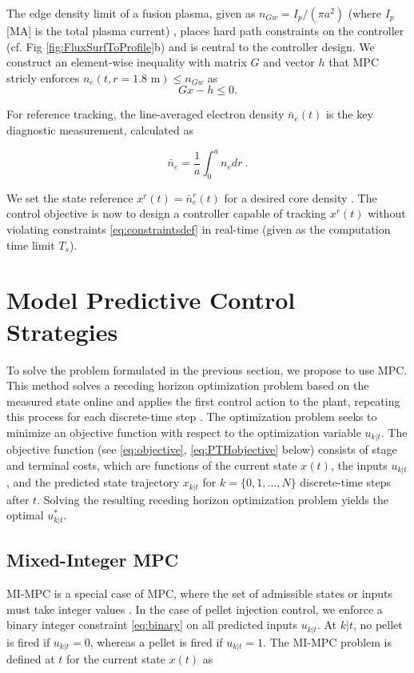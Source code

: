 \documentclass[journal,twoside,web]{ieeecolor}
\begin{document}
The edge density limit of a fusion plasma, given as $n_{Gw} = I_p/(\pi a^2)$ (where $I_p$ [MA] is the total plasma current) \cite{Greenwald1988}, places hard path constraints on the controller (cf. Fig \ref{fig:FluxSurfToProfile}b) and is central to the controller design. We construct an element-wise inequality with matrix $G$ and vector $h$ that MPC stricly enforces $n_e(t,r=1.8\textrm{ m}) \leq n_{Gw}$ as 
\begin{equation}
Gx - h \leq 0. \label{eq:constraintsdef}
\end{equation}

For reference tracking, the line-averaged electron density $\bar{n}_e(t)$ \cite{Heald1965} is the key diagnostic measurement, calculated as 

\begin{equation}
 \bar{n}_e = \frac{1}{a}\int_0^an_edr \!~ . \label{eq:lineAvgDens}
\end{equation}

\noindent We set the state reference $x^r(t) = \bar{n}_e^r(t)$ for a desired core density \cite{Bosman2021kalman}. The control objective is now to design a controller capable of tracking $x^r(t)$ without violating constraints \eqref{eq:constraintsdef} in real-time (given as the computation time limit $T_s$). 

\section{Model Predictive Control Strategies}
\label{sec:MPCapproach}
To solve the problem formulated in the previous section, we propose to use MPC. This method solves a receding horizon optimization problem based on the measured state online and applies the first control action to the plant, repeating this process for each discrete-time step \cite{Rawlings2017}. The optimization problem seeks to minimize an objective function with respect to the optimization variable $u_{k|t}$. The objective function (see \eqref{eq:objective}, \eqref{eq:PTHobjective} below) consists of stage and terminal costs, which are functions of the current state $x(t)$, the inputs $u_{k|t}$, and the predicted state trajectory $x_{k|t}$ for $k = \{0, 1,\ldots,N\}$ discrete-time steps after $t$. Solving the resulting receding horizon optimization problem yields the optimal $u^*_{k|t}$. 

\subsection{Mixed-Integer MPC}
\label{subsec:MIQP}
MI-MPC is a special case of MPC, where the set of admissible states or inputs must take integer values \cite{Kirches2011}. In the case of pellet injection control, we enforce a binary integer constraint \eqref{eq:binary} on all predicted inputs $u_{k|t}$. At $k|t$, no pellet is fired if $u_{k|t} = 0$, whereas a pellet is fired if $u_{k|t} = 1$. The MI-MPC problem is defined at $t$ for the current state $x(t)$ as
\end{document}
